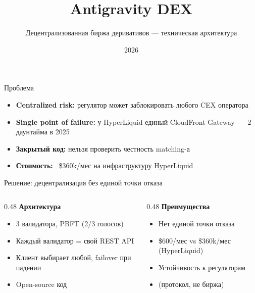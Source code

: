 \documentclass[aspectratio=169]{beamer}
\title{Antigravity DEX}
\subtitle{Децентрализованная биржа деривативов --- техническая архитектура}
\date{2026}
\begin{document}
\begin{frame}
\maketitle
{}
\end{frame}

\begin{frame}{Проблема}
\begin{itemize}
    \item \textbf{Centralized risk:} регулятор может заблокировать любого CEX оператора
    \item \textbf{Single point of failure:} у HyperLiquid единый CloudFront Gateway ---~2 даунтайма в 2025
    \item \textbf{Закрытый код:} нельзя проверить честность matching-а
    \item \textbf{Стоимость:} ~\$360k/мес на инфраструктуру HyperLiquid
\end{itemize}
\end{frame}

\begin{frame}{Решение: децентрализация без единой точки отказа}

\begin{columns}[t]
\begin{column}{0.48\textwidth}
\textbf{Архитектура}
\begin{itemize}
    \item 3 валидатора, PBFT (2/3 голосов)
    \item Каждый валидатор = свой REST API
    \item Клиент выбирает любой, failover при падении
    \item Open-source код
\end{itemize}
\end{column}
\begin{column}{0.48\textwidth}
\textbf{Преимущества}
\begin{itemize}
    \item Нет единой точки отказа
    \item \$600/мес vs \$360k/мес (HyperLiquid)
    \item Устойчивость к регуляторам
    \item(\dq протокол, не биржа\dq)
\end{itemize}
\end{column}
\end{columns}
\end{frame}
\end{document}
